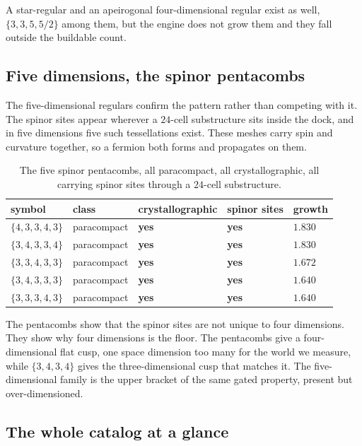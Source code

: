A star-regular and an apeirogonal four-dimensional regular exist as well, $\{3,3,5,5/2\}$ among them, but the engine does not grow them and they fall outside the buildable count.

\subsection{Five dimensions, the spinor pentacombs}

The five-dimensional regulars confirm the pattern rather than competing with it. The spinor sites appear wherever a $24$-cell substructure sits inside the dock, and in five dimensions five such tessellations exist. These meshes carry spin and curvature together, so a fermion both forms and propagates on them.

\begin{table}[ht]
\centering
\begin{tabular}{@{}lllll@{}}
\toprule
symbol & class & crystallographic & spinor sites & growth \\
\midrule
$\{4,3,3,4,3\}$ & paracompact & \textbf{yes} & \textbf{yes} & $1.830$ \\
$\{3,4,3,3,4\}$ & paracompact & \textbf{yes} & \textbf{yes} & $1.830$ \\
$\{3,3,4,3,3\}$ & paracompact & \textbf{yes} & \textbf{yes} & $1.672$ \\
$\{3,4,3,3,3\}$ & paracompact & \textbf{yes} & \textbf{yes} & $1.640$ \\
$\{3,3,3,4,3\}$ & paracompact & \textbf{yes} & \textbf{yes} & $1.640$ \\
\bottomrule
\end{tabular}
\caption{The five spinor pentacombs, all paracompact, all crystallographic, all carrying spinor sites through a $24$-cell substructure.}
\label{tab:catalog-5d}
\end{table}

The pentacombs show that the spinor sites are not unique to four dimensions. They show why four dimensions is the floor. The pentacombs give a four-dimensional flat cusp, one space dimension too many for the world we measure, while $\{3,4,3,4\}$ gives the three-dimensional cusp that matches it. The five-dimensional family is the upper bracket of the same gated property, present but over-dimensioned.

\subsection{The whole catalog at a glance}

